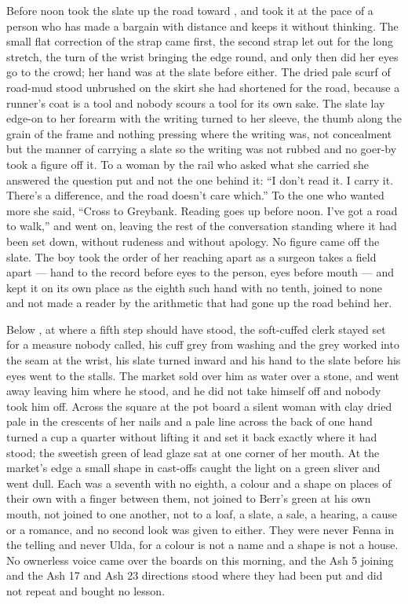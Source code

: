 Before noon  took the slate up the road toward , and took it at the pace of a person who has made a bargain with distance and keeps it without thinking. The small flat correction of the strap came first, the second strap let out for the long stretch, the turn of the wrist bringing the edge round, and only then did her eyes go to the crowd; her hand was at the slate before either. The dried pale scurf of road-mud stood unbrushed on the skirt she had shortened for the road, because a runner's coat is a tool and nobody scours a tool for its own sake. The slate lay edge-on to her forearm with the writing turned to her sleeve, the thumb along the grain of the frame and nothing pressing where the writing was, not concealment but the manner of carrying a slate so the writing was not rubbed and no goer-by took a figure off it. To a woman by the rail who asked what she carried she answered the question put and not the one behind it: “I don't read it. I carry it. There's a difference, and the road doesn't care which.” To the one who wanted more she said, “Cross to Greybank. Reading goes up before noon. I've got a road to walk,” and went on, leaving the rest of the conversation standing where it had been set down, without rudeness and without apology. No figure came off the slate. The boy took the order of her reaching apart as a surgeon takes a field apart --- hand to the record before eyes to the person, eyes before mouth --- and kept it on its own place as the eighth such hand with no tenth, joined to none and not made a reader by the arithmetic that had gone up the road behind her.

Below , at  where a fifth step should have stood, the soft-cuffed clerk stayed set for a measure nobody called, his cuff grey from washing and the grey worked into the seam at the wrist, his slate turned inward and his hand to the slate before his eyes went to the stalls. The market sold over him as water over a stone, and went away leaving him where he stood, and he did not take himself off and nobody took him off. Across the square at the pot board a silent woman with clay dried pale in the crescents of her nails and a pale line across the back of one hand turned a cup a quarter without lifting it and set it back exactly where it had stood; the sweetish green of lead glaze sat at one corner of her mouth. At the market's edge a small shape in cast-offs caught the light on a green sliver and went dull. Each was a seventh with no eighth, a colour and a shape on places of their own with a finger between them, not joined to Berr's green at his own mouth, not joined to one another, not to a loaf, a slate, a sale, a hearing, a cause or a romance, and no second look was given to either. They were never Fenna in the telling and never Ulda, for a colour is not a name and a shape is not a house. No ownerless voice came over the boards on this morning, and the Ash 5 joining and the Ash 17 and Ash 23 directions stood where they had been put and did not repeat and bought no lesson.

